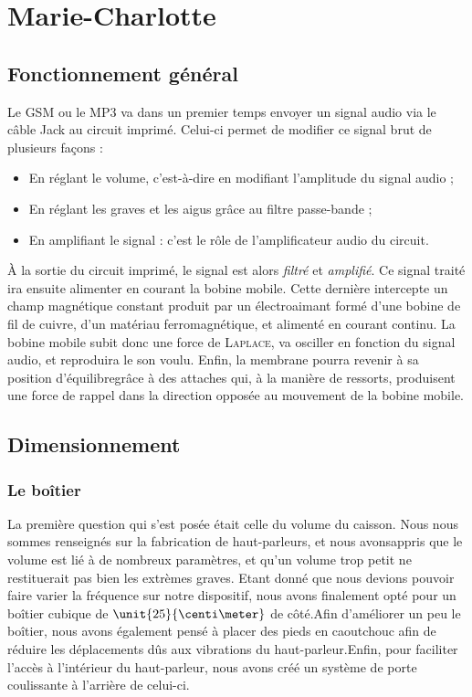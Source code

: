\documentclass{article}
\begin{document}
\section{Marie-Charlotte}
\subsection{Fonctionnement général}

Le GSM ou le MP3 va dans un premier temps envoyer un signal audio via le câble Jack au circuit imprimé. Celui-ci permet
de modifier ce signal brut de plusieurs façons :

\begin{itemize}
	\item En réglant le volume, c'est-à-dire en modifiant l'amplitude du signal audio ;
	\item En réglant les graves et les aigus grâce au filtre passe-bande ;
	\item En amplifiant le signal : c'est le rôle de l'amplificateur audio du circuit.
\end{itemize}

À la sortie du circuit imprimé, le signal est alors \textit{filtré} et \textit{amplifié}.
Ce signal traité ira ensuite alimenter en courant la bobine mobile. Cette dernière intercepte un champ magnétique constant 
produit par un électroaimant formé d'une bobine de fil de cuivre, d'un matériau ferromagnétique, et alimenté en courant continu.
La bobine mobile subit donc une force de \textsc{Laplace}, va osciller en fonction du  signal audio, et reproduira le son voulu.
Enfin, la membrane pourra revenir à sa position d'équilibregrâce à des attaches qui, à la manière de ressorts, produisent une
force de rappel dans la direction opposée au mouvement de la bobine mobile. 

\subsection{Dimensionnement}
\subsubsection{Le boîtier}
La première question qui s'est posée était celle du volume du caisson. Nous nous sommes renseignés sur la fabrication de 
haut-parleurs, et nous avonsappris que le volume est lié à de nombreux paramètres, et qu'un volume trop petit ne restituerait 
pas bien les extrèmes graves. Etant donné que nous devions pouvoir faire varier la fréquence sur notre dispositif, nous avons 
finalement opté pour un boîtier cubique de $\unit{25}{\centi\meter}$ de côté.Afin d'améliorer un peu le boîtier, nous avons
également pensé à placer des pieds en caoutchouc afin de réduire les déplacements dûs aux vibrations du haut-parleur.Enfin,
pour faciliter l'accès à l'intérieur du haut-parleur, nous avons créé un système de porte coulissante à l'arrière de celui-ci.
\end{document}

